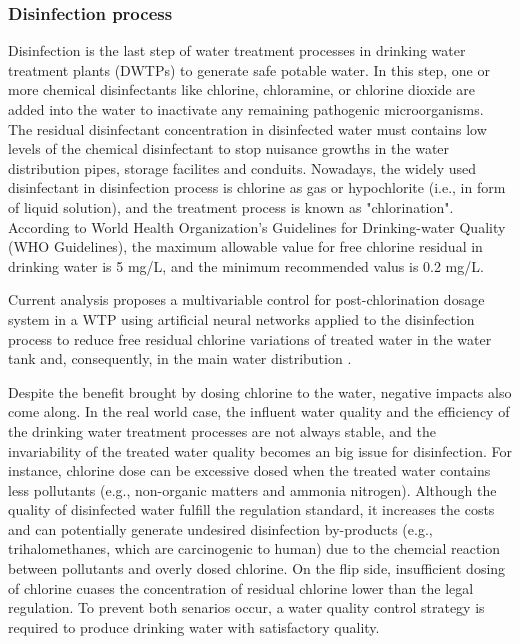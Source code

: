 \subsubsection{Disinfection process}
Disinfection is the last step of water treatment processes in drinking water treatment plants (DWTPs) to generate safe potable water. In this step, one or more chemical disinfectants like chlorine, chloramine, or chlorine dioxide are added into the water to inactivate any remaining pathogenic microorganisms. The residual disinfectant concentration in disinfected water must contains low levels of the chemical disinfectant to stop nuisance growths in the water distribution pipes, storage facilites and conduits. Nowadays, the widely used disinfectant in disinfection process is chlorine as gas or hypochlorite (i.e., in form of liquid solution), and the treatment process is known as "chlorination". According to World Health Organization's Guidelines for Drinking-water Quality (WHO Guidelines), the maximum allowable value for free chlorine residual in drinking water is 5 mg/L, and the minimum recommended valus is 0.2 mg/L. 

Current analysis proposes a multivariable control for post-chlorination dosage system in a WTP using artificial neural networks applied to the disinfection process to reduce free residual chlorine variations of treated water in the water tank and, consequently, in the main water distribution \cite{librantz_artificial_2018}.

Despite the benefit brought by dosing chlorine to the water, negative impacts also come along. In the real world case, the influent water quality and the efficiency of the drinking water treatment processes are not always stable, and the invariability of the treated water quality becomes an big issue for disinfection. For instance, chlorine dose can be excessive dosed when the treated water contains less pollutants (e.g., non-organic matters and ammonia nitrogen). Although the quality of disinfected water fulfill the regulation standard, it increases the costs and can potentially generate undesired disinfection by-products (e.g., trihalomethanes, which are carcinogenic to human) due to the chemcial reaction between pollutants and overly dosed chlorine. On the flip side, insufficient dosing of chlorine cuases the concentration of residual chlorine lower than the legal regulation. To prevent both senarios occur, a water quality control strategy is required to produce drinking water with satisfactory quality. 

